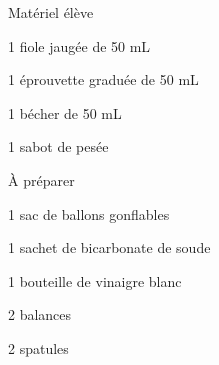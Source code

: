 
\begin{boiteMateriel}{Matériel élève}
  \effectifSeconde
  
  \begin{protocole}[2]
    \item 1 fiole jaugée de 50 mL
    \item 1 éprouvette graduée de 50 mL
    \item 1 bécher de 50 mL
    \item 1 sabot de pesée
  \end{protocole}
\end{boiteMateriel}


\begin{boiteMateriel}{À préparer}
  \begin{protocole}
    \item 1 sac de ballons gonflables
    \item 1 sachet de bicarbonate de soude
    \item 1 bouteille de vinaigre blanc
    \item 2 balances
    \item 2 spatules
  \end{protocole}
\end{boiteMateriel}
